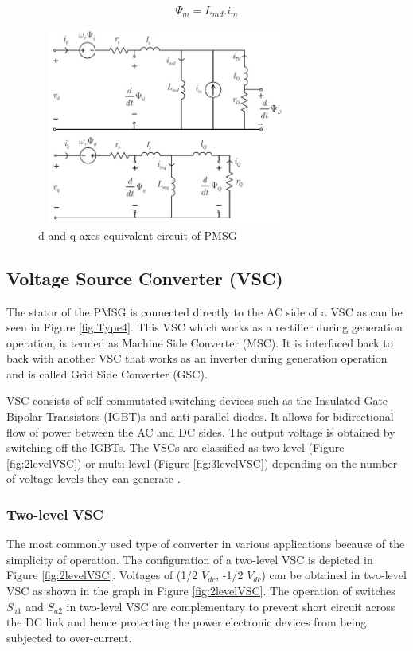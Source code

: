 \begin{equation}\label{Currentsource_MagFluxeq}
    \Psi_m = L_{md} . i_m
\end{equation}

\begin{figure}[H]
\centering
    \includegraphics[height = 6.5cm,width = 8.5cm]{Diagrams/Chapter_2/PMSG_equiv_ckt.png}
    \caption{d and q axes equivalent circuit of PMSG \cite{sebastian_transient_1989}}
    \label{fig:PMSG_equiv_ckt}
\end{figure}

\subsection{Voltage Source Converter (VSC)}\label{VSC_theory}
The stator of the \gls{PMSG} is connected directly to the \gls{AC} side of a \gls{VSC} as can be seen in Figure \ref{fig:Type4}. This \gls{VSC} which works as a rectifier during generation operation, is termed as Machine Side Converter (\gls{MSC}). It is interfaced back to back with another \gls{VSC} that works as an inverter during generation operation and is called Grid Side Converter (\gls{GSC}).

\gls{VSC} consists of self-commutated switching devices such as the Insulated Gate Bipolar Transistors (\gls{IGBT})s and anti-parallel diodes. It allows for bidirectional flow of power between the \gls{AC} and \gls{DC} sides. The output voltage is obtained by switching off the \gls{IGBT}s. The \gls{VSC}s are classified as two-level (Figure \ref{fig:2levelVSC}) or multi-level (Figure \ref{fig:3levelVSC}) depending on the number of voltage levels they can generate \cite{noauthor_appendix_2014-1}. 

\subsubsection{Two-level VSC}
The most commonly used type of converter in various applications because of the simplicity of operation. The configuration of a two-level \gls{VSC} is depicted in Figure \ref{fig:2levelVSC}. Voltages of (1/2 $V_{dc}$, -1/2 $V_{dc}$) can be obtained in two-level \gls{VSC} as shown in the graph in Figure \ref{fig:2levelVSC}. The operation of switches $S_{a1}$ and $S_{a2}$ in two-level \gls{VSC} are complementary to prevent short circuit across the \gls{DC} link and hence protecting the power electronic devices from being subjected to over-current.

